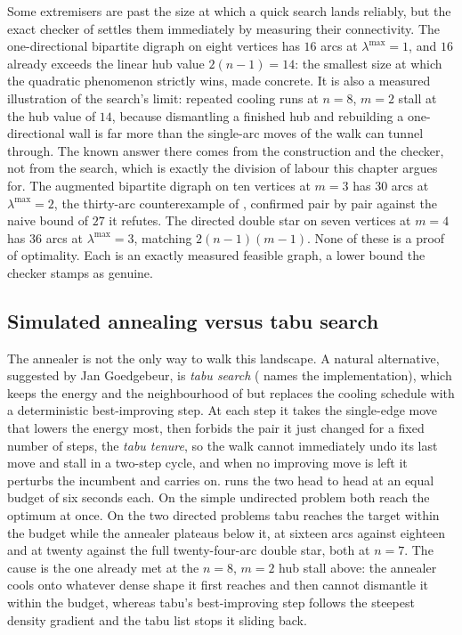 Some extremisers are past the size at which a quick search lands reliably, but the exact checker of  settles them immediately by measuring their connectivity. The one-directional bipartite digraph on eight vertices has $16$ arcs at $\lambda^{\max} = 1$, and $16$ already exceeds the linear hub value $2(n-1) = 14$: the smallest size at which the quadratic phenomenon strictly wins, made concrete. It is also a measured illustration of the search's limit: repeated cooling runs at $n = 8$, $m = 2$ stall at the hub value of $14$, because dismantling a finished hub and rebuilding a one-directional wall is far more than the single-arc moves of the walk can tunnel through. The known answer there comes from the construction and the checker, not from the search, which is exactly the division of labour this chapter argues for. The augmented bipartite digraph on ten vertices at $m = 3$ has $30$ arcs at $\lambda^{\max} = 2$, the thirty-arc counterexample of , confirmed pair by pair against the naive bound of $27$ it refutes. The directed double star on seven vertices at $m = 4$ has $36$ arcs at $\lambda^{\max} = 3$, matching $2(n-1)(m-1)$. None of these is a proof of optimality. Each is an exactly measured feasible graph, a lower bound the checker stamps as genuine.

\subsection{Simulated annealing versus tabu search}

The annealer is not the only way to walk this landscape. A natural alternative, suggested by Jan Goedgebeur, is \emph{tabu search} ( names the implementation), which keeps the energy and the neighbourhood of  but replaces the cooling schedule with a deterministic best-improving step. At each step it takes the single-edge move that lowers the energy most, then forbids the pair it just changed for a fixed number of steps, the \emph{tabu tenure}, so the walk cannot immediately undo its last move and stall in a two-step cycle, and when no improving move is left it perturbs the incumbent and carries on.  runs the two head to head at an equal budget of six seconds each. On the simple undirected problem both reach the optimum at once. On the two directed problems tabu reaches the target within the budget while the annealer plateaus below it, at sixteen arcs against eighteen and at twenty against the full twenty-four-arc double star, both at $n = 7$. The cause is the one already met at the $n = 8$, $m = 2$ hub stall above: the annealer cools onto whatever dense shape it first reaches and then cannot dismantle it within the budget, whereas tabu's best-improving step follows the steepest density gradient and the tabu list stops it sliding back.

